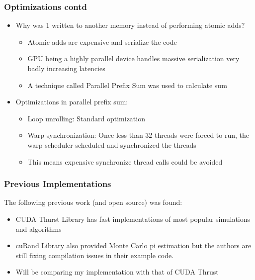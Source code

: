 \documentclass[mathserif]{beamer}
\begin{document}
\begin{frame}                                                                                                                                                                          
\frametitle{Optimizations contd}
\begin{itemize}
\item Why was 1 written to another memory instead of performing atomic adds? 
\begin{itemize}
\item Atomic adds are expensive and serialize the code 
\item GPU being a highly parallel device handles massive serialization very badly increasing latencies 
\item A technique called Parallel Prefix Sum was used to calculate sum
\end{itemize}
\item Optimizations in parallel prefix sum:  
\begin{itemize}
\item Loop unrolling: Standard optimization 
\item Warp synchronization: Once less than 32 threads were forced to run, the warp scheduler scheduled and synchronized the threads 
\item This means expensive synchronize thread calls could be avoided
\end{itemize}
\end{itemize}
\end{frame}              

\begin{frame}                                                                                                                                                                          
\frametitle{Previous Implementations}
The following previous work (and open source) was found:
\begin{itemize}
\item CUDA Thurst Library has fast implementations of most popular simulations and algorithms 
\item cuRand Library also provided Monte Carlo pi estimation but the authors are still fixing compilation issues in their example code. 
\item Will be comparing my implementation with that of CUDA Thrust 
\end{itemize}
\end{frame}             
\end{document}
